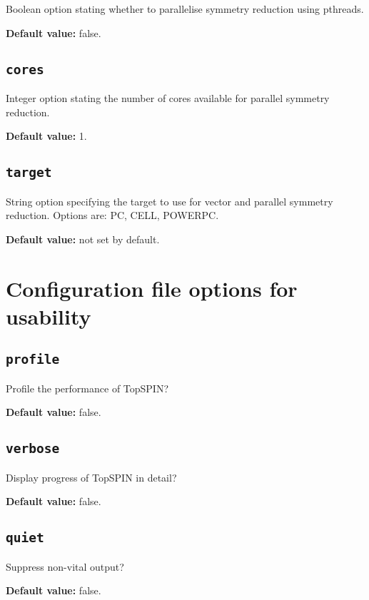 Boolean option stating whether to parallelise symmetry reduction using pthreads.

\noindent\textbf{Default value: } false.

\subsection{\texttt{cores}}

Integer option stating the number of cores available for parallel symmetry reduction.

\noindent\textbf{Default value: } 1.

\subsection{\texttt{target}}\label{sec:overview:symmetryreductionconfig:target}

String option specifying the target to use for vector and parallel symmetry reduction.  Options are: PC, CELL, POWERPC.

\noindent\textbf{Default value: } not set by default.

\section{Configuration file options for usability}

\subsection{\texttt{profile}}

Profile the performance of TopSPIN?

\noindent\textbf{Default value: } false.

\subsection{\texttt{verbose}}

Display progress of TopSPIN in detail?

\noindent\textbf{Default value: } false.

\subsection{\texttt{quiet}}

Suppress non-vital output?

\noindent\textbf{Default value: } false.
